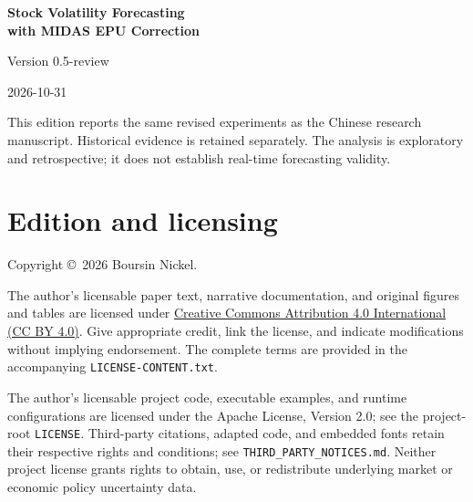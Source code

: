 \documentclass[11pt,a4paper]{article}
\begin{document}
\begin{titlepage}\centering\vspace*{2.6cm}
{\LARGE\bfseries Stock Volatility Forecasting\\[0.5em]with MIDAS EPU Correction\par}
\vspace{1cm}{\Large Stable Estimation, Residual Ablation,\\and Retrospective Reanalysis\par}
\vspace{2cm}{\Large Boursin Nickel\par}
\vspace{0.8cm}{\large English research edition\par}
\vfill
Version 0.5-review\par
2026-10-31\par
\vspace{1cm}
\begin{minipage}{0.87\textwidth}\centering
This edition reports the same revised experiments as the Chinese research manuscript. Historical evidence is retained separately. The analysis is exploratory and retrospective; it does not establish real-time forecasting validity.
\end{minipage}
\end{titlepage}
\section*{Edition and licensing}
\thispagestyle{plain}
Copyright \copyright\ 2026 Boursin Nickel.

The author's licensable paper text, narrative documentation, and original figures and tables are licensed under \href{https://creativecommons.org/licenses/by/4.0/}{Creative Commons Attribution 4.0 International (CC BY 4.0)}. Give appropriate credit, link the license, and indicate modifications without implying endorsement. The complete terms are provided in the accompanying \texttt{LICENSE-CONTENT.txt}.

The author's licensable project code, executable examples, and runtime configurations are licensed under the Apache License, Version 2.0; see the project-root \texttt{LICENSE}. Third-party citations, adapted code, and embedded fonts retain their respective rights and conditions; see \texttt{THIRD\_PARTY\_NOTICES.md}. Neither project license grants rights to obtain, use, or redistribute underlying market or economic policy uncertainty data.
\end{document}
